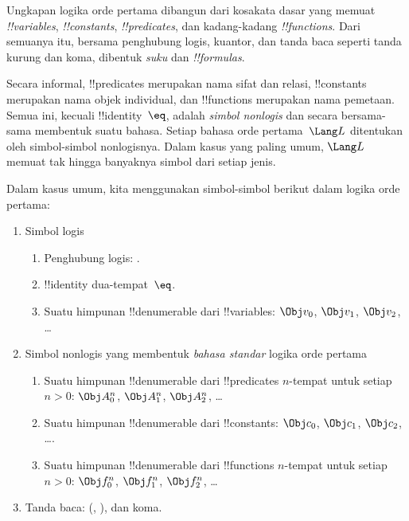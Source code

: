 \documentclass[../../../include/open-logic-section]{subfiles}
\begin{document}



Ungkapan logika orde pertama dibangun dari kosakata dasar yang memuat
\emph{!!{variable}s}, \emph{!!{constant}s}, \emph{!!{predicate}s}, dan
kadang-kadang \emph{!!{function}s}. Dari semuanya itu, bersama penghubung
logis, kuantor, dan tanda baca seperti tanda kurung dan koma, dibentuk
\emph{suku} dan \emph{!!{formula}s}.

\begin{explain}
Secara informal, !!{predicate}s merupakan nama sifat dan relasi,
!!{constant}s merupakan nama objek individual, dan !!{function}s merupakan
nama pemetaan. Semua ini, kecuali !!{identity}~$\eq$, adalah
\emph{simbol nonlogis} dan secara bersama-sama membentuk suatu bahasa.
Setiap bahasa orde pertama~$\Lang L$ ditentukan oleh simbol-simbol
nonlogisnya. Dalam kasus yang paling umum, $\Lang L$ memuat tak hingga
banyaknya simbol dari setiap jenis.
\end{explain}

Dalam kasus umum, kita menggunakan simbol-simbol berikut dalam logika orde
pertama:

\begin{enumerate}
\item Simbol logis
\begin{enumerate}
\item Penghubung logis:
  \startycommalist
  .
\item !!{identity} dua-tempat~$\eq$.
\item Suatu himpunan !!{denumerable} dari !!{variable}s: $\Obj v_0$, $\Obj v_1$, $\Obj
  v_2$, \dots
\end{enumerate}
\item Simbol nonlogis yang membentuk \emph{bahasa standar} logika orde
  pertama
\begin{enumerate}
\item Suatu himpunan !!{denumerable} dari !!{predicate}s $n$-tempat untuk
  setiap $n>0$: $\Obj A^n_0$, $\Obj A^n_1$, $\Obj A^n_2$, \dots
\item Suatu himpunan !!{denumerable} dari !!{constant}s: $\Obj c_0$, $\Obj c_1$, $\Obj
  c_2$, \dots.
\item Suatu himpunan !!{denumerable} dari !!{function}s $n$-tempat untuk
  setiap $n>0$: $\Obj f^n_0$, $\Obj f^n_1$, $\Obj f^n_2$, \dots
\end{enumerate}
\item Tanda baca: (, ), dan koma.
\end{enumerate}
\end{document}
